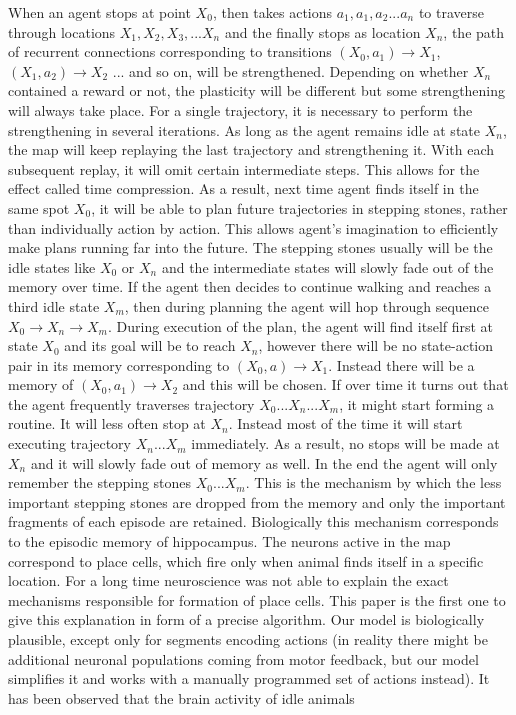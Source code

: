 \documentclass[12pt]{article}
\begin{document}
When an agent stops at point $X_0$, then takes actions $a_1, a_1, a_2... a_n$ to traverse through locations $X_1, X_2, X_3,...X_n$ and the finally stops as location $X_n$, the path of recurrent connections corresponding to transitions  $(X_0,a_1)\rightarrow X_1$, $(X_1,a_2)\rightarrow X_2$ ... and so on, will be strengthened. Depending on whether $X_n$ contained a reward or not, the plasticity will be different but some strengthening will always take place. For a single trajectory, it is necessary to perform the strengthening in several iterations. As long as the agent remains idle at state $X_n$, the map will keep replaying the last trajectory and strengthening it. With each subsequent replay, it will omit certain intermediate steps. This allows for the effect called time compression. As a result, next time agent finds itself in the same spot $X_0$, it will be able to plan future trajectories in stepping stones, rather than individually  action by action. This allows agent's imagination to efficiently make plans running far into the future. The stepping stones usually will be the idle states like $X_0$ or $X_n$ and the intermediate states will slowly fade out of the memory over time. If the agent then decides to continue walking and reaches  a third idle state $X_m$, then during planning the agent will hop through sequence $X_0\rightarrow X_n \rightarrow X_m$. During execution of the plan, the agent will find itself first at state $X_0$ and its goal will be to reach $X_n$, however there will be no state-action pair in its memory corresponding to $(X_0, a)\rightarrow X_1$. Instead there will be a memory of $(X_0,a_1)\rightarrow X_2$ and this will be chosen. If over time it turns out that the agent frequently traverses trajectory $X_0...X_n...X_m$, it might start forming a routine. It will less often stop at $X_n$. Instead most of the time it will start executing trajectory $X_n...X_m$ immediately. As a result, no stops will be made at $X_n$ and it will slowly fade out of memory as well. In the end the agent will only remember  the stepping stones $X_0...X_m$. This is the mechanism by which the less important stepping stones are dropped from the memory and only the important fragments of each episode are retained. Biologically this mechanism corresponds to the episodic memory of hippocampus. The neurons active in the map correspond to place cells, which fire only when animal finds itself in a specific location. For a long time neuroscience was not able to explain the exact mechanisms responsible for formation of place cells. This paper is the first one to give this explanation in form of a precise algorithm. Our model is biologically plausible, except only for segments encoding actions (in reality there might be additional neuronal populations coming from motor feedback, but our model simplifies it and works with a manually programmed set of actions instead). It has been observed that the brain activity of idle animals
\end{document}
